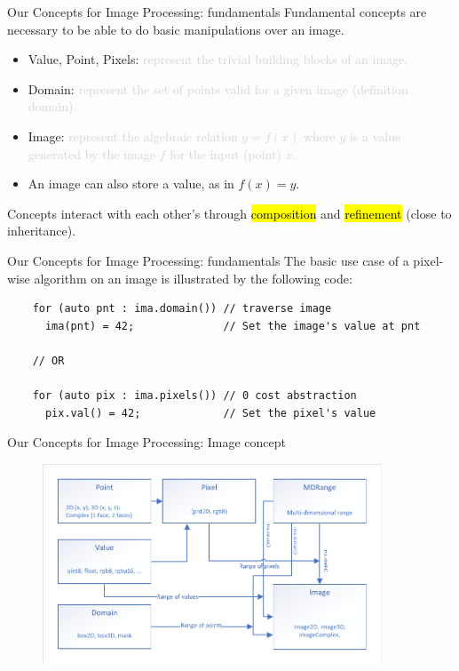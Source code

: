 \documentclass[12pt,aspectratio=169]{beamer}
\makeatletter
\newcommand{\GRAYOUT}[1]{\textcolor{lightgray}{#1}}%
\let\HL\hl
\renewcommand\hl{%
  \let\set@color\beamerorig@set@color
  \let\reset@color\beamerorig@reset@color
  \HL}
\makeatother
\begin{document}
\begin{frame}[fragile]{Our Concepts for Image Processing: fundamentals}
  Fundamental concepts are necessary to be able to do basic manipulations over an image.
  \begin{itemize}
    \item Value, Point, Pixels: \GRAYOUT{represent the trivial building blocks of an image.}
    \item Domain: \GRAYOUT{represent the set of points valid for a given image (definition domain).}
    \item Image: \GRAYOUT{represent the algebraic relation \(y = f(x)\) where \(y\) is a value generated by the image \(f\) for
            the input (point) \(x\).}
    \item An image can also store a value, as in \(f(x) = y\).
  \end{itemize}
  Concepts interact with each other's through \hl{composition} and \hl{refinement} (close to inheritance).
\end{frame}

\begin{frame}[fragile]{Our Concepts for Image Processing: fundamentals}
  The basic use case of a pixel-wise algorithm on an image is illustrated by the following code:
  \begin{verbatim}
    for (auto pnt : ima.domain()) // traverse image
      ima(pnt) = 42;              // Set the image's value at pnt
    
    // OR

    for (auto pix : ima.pixels()) // 0 cost abstraction
      pix.val() = 42;             // Set the pixel's value
  \end{verbatim}
\end{frame}

\begin{frame}[fragile]{Our Concepts for Image Processing: Image concept}
  \centering
  \begin{figure}
    \includegraphics[width=0.9\textwidth]{../figures/concepts/image}
  \end{figure}
\end{frame}
\end{document}
